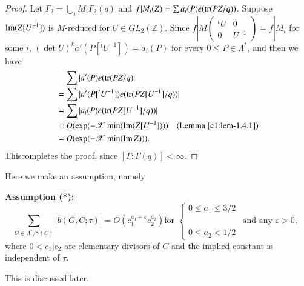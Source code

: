 \begin{proof}
Let $\Gamma_{2}=\bigcup\limits_{i}M_{i}\Gamma_{2}(q)$ and
$f|M_{i}(Z)=\sum a_{i}(P)e(\operatorname{tr}(PZ/q))$. Suppose $\operatorname{Im}(Z[U^{-1}])$ is
$M$-reduced for $U\in GL_{2}(\mathbb{Z})$. Since
$f|M\left(\begin{smallmatrix} {}^{t}U & 0\\ 0 &  U^{-1}
\end{smallmatrix}\right)=f|M_{i}$ for some $i$, $(\det
U)^{k}a'(P[{}^{t}U^{-1}])=a_{i}(P)$ for every $0\leq
P\in\Lambda^{\ast}$, and then we have
\begin{align*}
&\quad\sum |a'(P)e(\operatorname{tr}(PZ/q)|\\
&= \sum|a'(P[{}^{t}U^{-1}])e(\operatorname{tr}(PZ[U^{-1}]/q))|\\
&= \sum |a_{i}(P)e(\operatorname{tr}(PZ[U^{-1}]/q))|\\
&=O(\exp(-\mathscr{X}\min(\operatorname{Im} (Z[U^{-1}])))\quad\text{(Lemma
    \ref{c1:lem-1.4.1})}\\
&= O(\exp(-\mathscr{X}\min(\operatorname{Im} Z))).
\end{align*}
This\pageoriginale completes the proof, since $[\Gamma:\Gamma(q)]<\infty$.
\end{proof}

Here we make an assumption, namely


\medskip
\noindent
{\bf Assumption (*):}
{\fontsize{10}{12}\selectfont
$$
\sum_{G\in\Lambda^{\ast}/\gamma(C)}|b(G,C;\tau)|
=O(c^{a_{1}+\varepsilon}_{1}c^{a_{2}}_{2})\text{
  \ for \ } 
\begin{cases}
0\leq a_{1}\leq 3/2 & \\
 &\text{and any } \varepsilon>0,\\
0\leq a_{2}<1/2
\end{cases}
$$}\relax
where $0<c_{1}|c_{2}$ are elementary divisors of $C$ and the implied
constant is independent of $\tau$.

This is discussed later.

